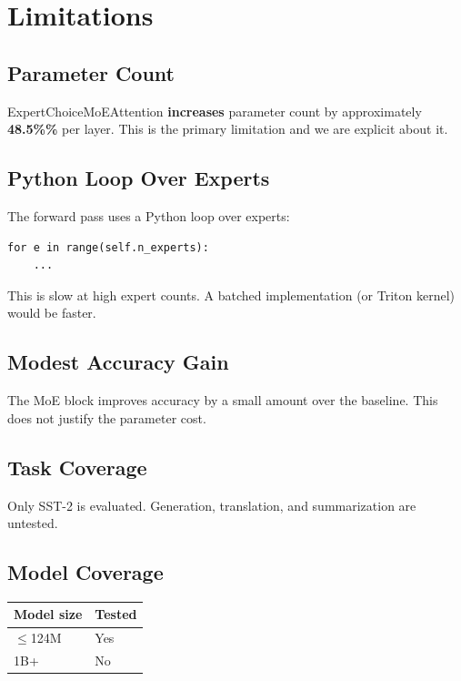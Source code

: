 \section{Limitations}

\subsection{Parameter Count}

ExpertChoiceMoEAttention \textbf{increases} parameter count by approximately 
\textbf{48.5\%\%} per layer. This is the primary limitation and we are 
explicit about it.

\subsection{Python Loop Over Experts}

The forward pass uses a Python loop over experts:

\begin{lstlisting}
for e in range(self.n_experts):
    ...
\end{lstlisting}

This is slow at high expert counts. A batched implementation (or Triton 
kernel) would be faster.

\subsection{Modest Accuracy Gain}

The MoE block improves accuracy by a small amount over the baseline. This 
does not justify the parameter cost.

\subsection{Task Coverage}

Only SST-2 is evaluated. Generation, translation, and summarization are 
untested.

\subsection{Model Coverage}

\begin{table}[H]
\centering
\small
\begin{tabular}{ll}
\toprule
\textbf{Model size} & \textbf{Tested} \\
\midrule
$\le$124M & Yes \\
1B+ & No \\
\bottomrule
\end{tabular}
\end{table}


